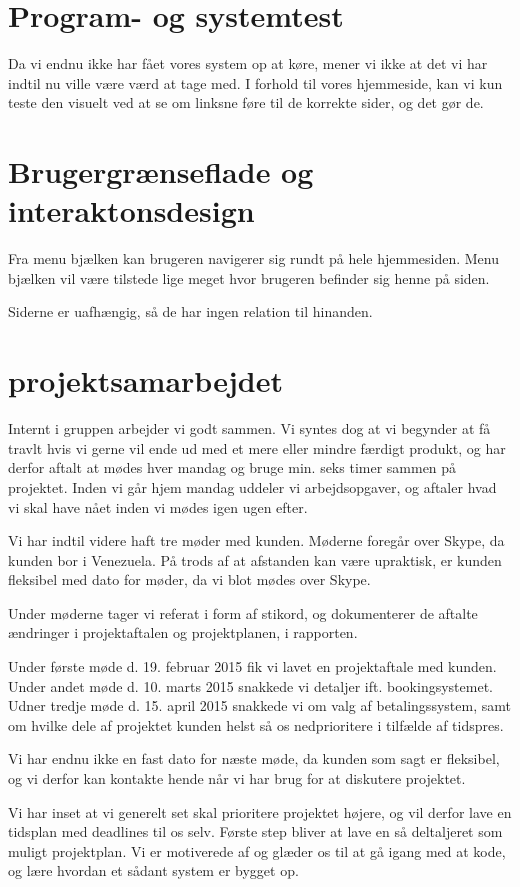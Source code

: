 \documentclass[12pt,a4paper]{article}
\begin{document}
\section{Program- og systemtest}
Da vi endnu ikke har fået vores system op at køre, mener vi ikke at det vi har indtil nu ville være værd at tage med. I forhold til vores hjemmeside, kan vi kun teste den visuelt ved at se om linksne føre til de korrekte sider, og det gør de.
\newpage
\section{Brugergrænseflade og interaktonsdesign}
Fra menu bjælken kan brugeren navigerer sig rundt på hele hjemmesiden. Menu bjælken vil være tilstede lige meget hvor brugeren befinder sig henne på siden.

Siderne er uafhængig, så de har ingen relation til hinanden.
\newpage
\section{projektsamarbejdet}
Internt i gruppen arbejder vi godt sammen. Vi syntes dog at vi begynder at få travlt hvis vi gerne vil ende ud med et mere eller mindre færdigt produkt, og har derfor aftalt at mødes hver mandag og bruge min. seks timer sammen på projektet. Inden vi går hjem mandag uddeler vi arbejdsopgaver, og aftaler hvad vi skal have nået inden vi mødes igen ugen efter. 

Vi har indtil videre haft tre møder med kunden. Møderne foregår over Skype, da kunden bor i Venezuela. På trods af at afstanden kan være upraktisk, er kunden fleksibel med dato for møder, da vi blot mødes over Skype.

Under møderne tager vi referat i form af stikord, og dokumenterer de aftalte ændringer i projektaftalen og projektplanen, i rapporten. 

Under første møde d. 19. februar 2015 fik vi lavet en projektaftale med kunden.
Under andet møde d. 10. marts 2015 snakkede vi detaljer ift. bookingsystemet.
Udner tredje møde d. 15. april 2015 snakkede vi om valg af betalingssystem, samt om hvilke dele af projektet kunden helst så os nedprioritere i tilfælde af tidspres.

Vi har endnu ikke en fast dato for næste møde, da kunden som sagt er fleksibel, og vi derfor kan kontakte hende når vi har brug for at diskutere projektet.

Vi har inset at vi generelt set skal prioritere projektet højere, og vil derfor lave en tidsplan med deadlines til os selv. Første step bliver at lave en så deltaljeret som muligt projektplan.
Vi er motiverede af og glæder os til at gå igang med at kode, og lære hvordan et sådant system er bygget op. 
\newpage
\end{document}

